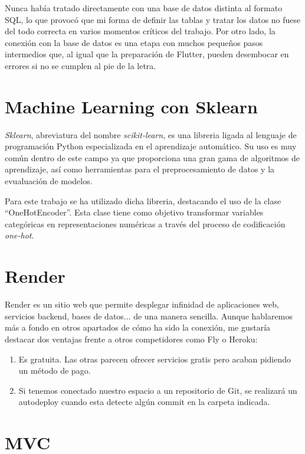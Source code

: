 	Nunca había tratado directamente con una base de datos distinta al formato SQL, lo que provocó que mi forma de definir las tablas y tratar los datos no fuese del todo correcta en varios momentos críticos del trabajo. Por otro lado, la conexión con la base de datos es una etapa con muchos pequeños pasos intermedios que, al igual que la preparación de Flutter, pueden desembocar en errores si no se cumplen al pie de la letra.


\section{Machine Learning con Sklearn}

	\emph{Sklearn}, abreviatura del nombre \emph{scikit-learn}, es una libreria ligada al lenguaje de programación Python especializada en el aprendizaje automático. Su uso es muy común dentro de este campo ya que proporciona una gran gama de algoritmos de aprendizaje, así como herramientas para el preprocesamiento de datos y la evualuación de modelos.
	
	Para este trabajo se ha utilizado dicha libreria, destacando el uso de la clase ``OneHotEncoder''. Esta clase tiene como objetivo transformar variables categóricas en representaciones numéricas a través del proceso de codificación \emph{one-hot}.
	
\section{Render}

	Render es un sitio web que permite desplegar infinidad de aplicaciones web, servicios backend, bases de datos... de una manera sencilla. Aunque hablaremos más a fondo en otros apartados de cómo ha sido la conexión, me gustaría destacar dos ventajas frente a otros competidores como Fly o Heroku:
	\begin{enumerate}
		\item Es gratuita. Las otras parecen ofrecer servicios gratis pero acaban pidiendo un método de pago.
		\item Si tenemos conectado nuestro espacio a un repositorio de Git, se realizará un autodeploy cuando esta detecte algún commit en la carpeta indicada.
	\end{enumerate}
	
\section{MVC}

